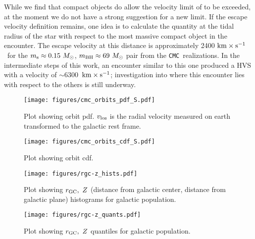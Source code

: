 \documentclass[twocolumn]{aastex631}
\newcommand{\kms}{${\rm km \times s^{-1}}$}
\newcommand{\CMC}{\texttt{CMC}}
\begin{document}
While we find that compact objects do allow the velocity limit of \citet{1991AJ....101..562L} to be exceeded, at the moment we do not have a strong suggestion for a new limit.
If the escape velocity definition remains, one idea is to calculate the quantity at the tidal radius of the star with respect to the most massive compact object in the encounter.
The escape velocity at this distance is approximately 2400 \kms\ for the $m_{\rm s}\approx0.15~M_\odot$, $m_{\rm BH}\approx69~M_\odot$ pair from the \CMC\ realizations.
In the intermediate steps of this work, an encounter similar to this one produced a HVS with a velocity of $\sim$6300~\kms; investigation into where this encounter lies with respect to the others is still underway.


\begin{figure}
    \begin{centering}
        \texttt{[image: figures/cmc\_orbits\_pdf\_S.pdf]}
        \caption{
            Plot showing orbit pdf.
            $v_{\rm los}$ is the radial velocity measured on earth transformed to the galactic rest frame.
        }
        \label{fig:cmc_orbits_pdf}
    \end{centering}
\end{figure}


\begin{figure}
    \begin{centering}
        \texttt{[image: figures/cmc\_orbits\_cdf\_S.pdf]}
        \caption{
            Plot showing orbit cdf.
        }
        \label{fig:cmc_orbits_cdf}
    \end{centering}
\end{figure}

\begin{figure}
    \begin{centering}
        \texttt{[image: figures/rgc-z\_hists.pdf]}
        \caption{
            Plot showing $r_{\rm GC},\ Z$ (distance from galactic center, distance from galactic plane) histograms for galactic population.
        }
        \label{fig:rgc-z_hists}
    \end{centering}
\end{figure}

\begin{figure}
    \begin{centering}
        \texttt{[image: figures/rgc-z\_quants.pdf]}
        \caption{
            Plot showing $r_{\rm GC},\ Z$ quantiles for galactic population.
        }
        \label{fig:rgc-z_quants}
    \end{centering}
\end{figure}


\end{document}
